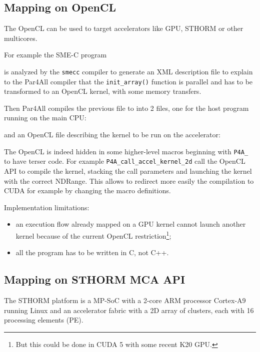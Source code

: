 \documentclass[a4paper]{article}
\begin{document}
\subsection{Mapping on OpenCL}
\label{sec:mapping-gpu}

The OpenCL can be used to target accelerators like GPU, STHORM or other
multicores.

For example the SME-C program



is analyzed by the \texttt{smecc} compiler to generate an XML description
file to explain to the Par4All compiler that the \lstinline|init_array()|
function is parallel and has to be transformed to an OpenCL kernel, with
some memory transfers.

Then Par4All compiles the previous file to into 2 files, one for the host
program running on the main CPU:



and an OpenCL file describing the kernel to be run on the accelerator:



The OpenCL is indeed hidden in some higher-level macros beginning with
\verb|P4A_| to have terser code. For example
\verb|P4A_call_accel_kernel_2d| call the OpenCL API to compile the kernel,
stacking the call parameters and launching the kernel with the correct
NDRange. This allows to redirect more easily the compilation to CUDA for
example by changing the macro definitions.

Implementation limitations:
\begin{itemize}
\item an execution flow already mapped on a GPU kernel cannot launch
  another kernel because of the current OpenCL restriction\footnote{But
    this could be done in CUDA 5 with some recent K20 GPU.};
\item all the program has to be written in C, not C++.
\end{itemize}


\subsection{Mapping on STHORM MCA API}
\label{sec:prod-inform}

The STHORM platform is a MP-SoC with a 2-core ARM processor Cortex-A9
running Linux and an accelerator fabric with a 2D array of clusters, each
with 16 processing elements (PE).
\end{document}
